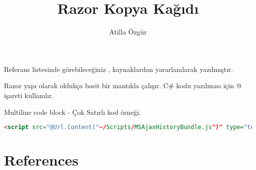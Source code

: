\documentclass[10pt,a4paper]{article}
\newcommand{\authorName}{Atilla \"Ozg\"ur}
\newcommand{\titleName}{Razor Kopya Kağıdı}
\begin{document}
\author{\authorName}
\title{\titleName}



\maketitle


Referans listesinde görebileceğiniz \cite{Haack2011C},\cite{Haley2010Developer} kaynaklardan
yararlanılarak yazılmıştır.


Razor yapı olarak oldukça basit bir mantıkla çalışır.
C\# kodu yazılması için @ işareti kullanılır.




Multiline code block - Çok Satırlı kod örneği.












\begin{lstlisting}[label=code-ExampleOfInlineExpression,caption=Example of Inline Expression,language=html]
<script src="@Url.Content("~/Scripts/MSAjaxHistoryBundle.js")" type="text/javascript"></script>
\end{lstlisting}






\section*{References}





% 

\end{document}
